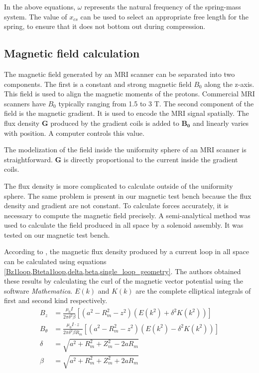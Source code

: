 \documentclass[letterpaper, 10 pt, conference]{ieeeconf}  %
\begin{document}
In the above equations, $\omega$ represents the natural frequency of the spring-mass system. The value of $x_{cs}$ can be used to select an appropriate free length for the spring, to ensure that it does not bottom out during compression. 
\subsection{Magnetic field calculation}
\label{magfield}
The magnetic field generated by an MRI scanner can be separated into two components. The first is a constant and strong magnetic field $B_0$ along the z-axis. This field is used to align the magnetic moments of the protons. Commercial MRI scanners have $B_0$ typically ranging from 1.5 to 3 T. The second component of the field is the magnetic gradient. It is used to encode the MRI signal spatially. The flux density $\mathbf{G}$ produced by the gradient coils is added to $\mathbf{B_0}$ and linearly varies with position. A computer controls this value.\par
The modelization of the field inside the uniformity sphere of an MRI scanner is straightforward. $\mathbf{G}$ is directly proportional to the current inside the gradient coils.\par

The flux density is more complicated to calculate outside of the uniformity sphere. The same problem is present in our magnetic test bench because the flux density and gradient are not constant. To calculate forces accurately, it is necessary to compute the magnetic field precisely. A semi-analytical method was used to calculate the field produced in all space by a solenoid assembly. It was tested on our magnetic test bench.\par
According to \cite{simpson2001simple}, the magnetic flux density produced by a current loop in all space can be calculated using equations \cref{Bz1loop,Bteta1loop,delta,beta,single_loop_geometry}. The authors obtained these results by calculating the curl of the magnetic vector potential using the software \textit{Mathematica}.  $E(k)$ and $K(k)$ are the complete elliptical integrals of first and second kind respectively.
\begin{align}
B_z &=\frac{\mu _0I}{2\pi\delta ^{2}\beta  }\left [ \left ( a^2-R_m ^2-z^2 \right )(E(k^2)+\delta ^2K(k^2)) \right ] 
\label{Bz1loop}\\
B_\theta &=\frac{\mu _0 I \cdot z}{2\pi\delta ^{2}\beta R_m   }\left [ \left ( a^2-R_m ^2-z^2 \right )(E(k^2)-\delta ^2K(k^2)) \right ]
\label{Bteta1loop}\\
\delta &=\sqrt{a^2+R_m^2+Z_m^2-2aR_m}
\label{delta}\\
\beta &=\sqrt{a^2+R_m^2+Z_m^2+2aR_m}
\label{beta}
\end{align}
\end{document}
